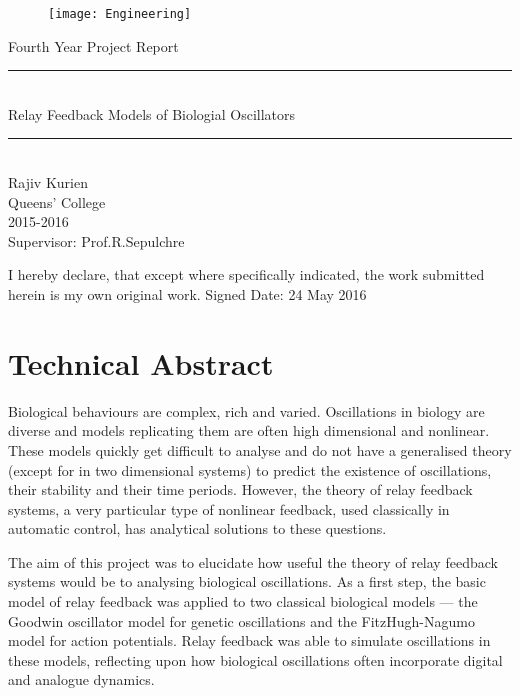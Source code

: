 \documentclass[a4paper, 12pt]{article}
\begin{document}
\begin{titlepage}
 \vspace*{\fill}
	\begin{center}
    	\begin{figure}
			\texttt{[image: Engineering]}
		\end{figure}
		{\Large Fourth Year Project Report} \vspace{0.25cm}
		\rule{\textwidth}{.1pt} \\[0.25cm]
		{\Huge Relay Feedback Models of Biologial Oscillators}\\%
		\rule{\textwidth}{.1pt} \\[0.5cm]
		\Large{
	Rajiv Kurien\\Queens' College\\2015-2016 \\ \vspace{2cm} Supervisor: Prof.R.Sepulchre
		}
	\end{center}
     \vspace*{\fill}
 I hereby declare, that except where specifically indicated, the work submitted herein is my own original work. 
 \newline Signed \hrulefill  \hspace{2cm} Date: 24 May 2016 \hspace{1cm}
\end{titlepage}
\section*{Technical Abstract}

\hspace{0.5cm} Biological behaviours are complex, rich and varied. Oscillations in biology are diverse and models replicating them are often high dimensional and nonlinear. These models quickly get difficult to analyse and do not have a generalised theory (except for in two dimensional systems) to predict the existence of oscillations, their stability and their time periods. However, the theory of relay feedback systems, a very particular type of nonlinear feedback, used classically in automatic control, has analytical solutions to these questions. 

The aim of this project was to elucidate how useful the theory of relay feedback systems would be to analysing biological oscillations. As a first step, the basic model of relay feedback was applied to two classical biological models --- the Goodwin oscillator model for genetic oscillations and the FitzHugh-Nagumo model for action potentials. Relay feedback was able to simulate oscillations in these models, reflecting upon how biological oscillations often incorporate digital and analogue dynamics. 
\end{document}
